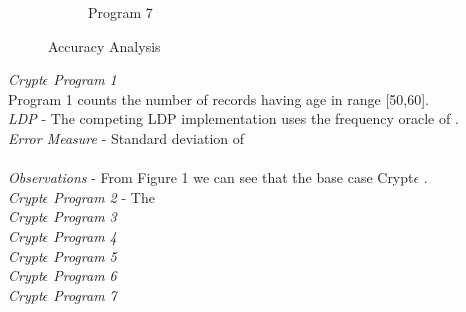 \begin{figure}
\begin{subfigure}[b]{0.3\textwidth}
        \caption{Program 7}
        \label{fig:mouse}
    \end{subfigure}
   \caption{Accuracy Analysis}
\end{figure}
\textit{Crypt$\epsilon$ Program 1}\\
Program 1 counts the number of records having age in range [50,60].  
\\\textit{LDP } - The competing LDP implementation uses the frequency oracle of \cite{LDP1}. 
\\\textit{Error Measure} - Standard deviation of 
\\\textit{}
\\\textit{Observations} - From Figure 1 we can see that the base case Crypt$\epsilon$ .  
\\\textit{Crypt$\epsilon$ Program 2} - The \\
\textit{Crypt$\epsilon$ Program 3}\\
\textit{Crypt$\epsilon$ Program 4}\\
\textit{Crypt$\epsilon$ Program 5}\\
\textit{Crypt$\epsilon$ Program 6}\\
\textit{Crypt$\epsilon$ Program 7}\\

